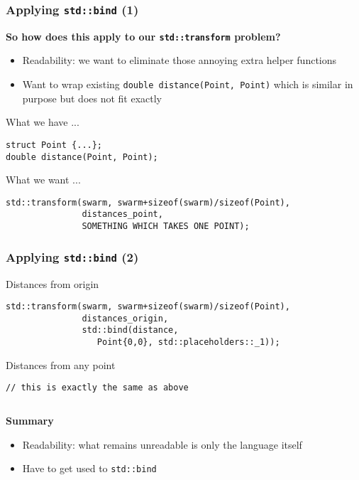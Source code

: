 \begin{frame}[fragile]
  \frametitle{Applying \texttt{std::bind} (1)}

  \textbf{So how does this apply to our \texttt{std::transform}
    problem?}

  \begin{itemize}
  \item Readability: we want to eliminate those annoying extra helper
    functions
  \item Want to wrap existing \texttt{double distance(Point, Point)}
    which is similar in purpose but does not fit exactly
  \end{itemize}

  \begin{block}{What we have ...}
\begin{verbatim}
struct Point {...};
double distance(Point, Point);
\end{verbatim}
  \end{block}

  \begin{block}{What we want ...}
\begin{verbatim}
std::transform(swarm, swarm+sizeof(swarm)/sizeof(Point), 
               distances_point, 
               SOMETHING WHICH TAKES ONE POINT);
\end{verbatim}
  \end{block}
  
\end{frame}

\begin{frame}[fragile]
  \frametitle{Applying \texttt{std::bind} (2)}

  \begin{block}{Distances from origin}
\begin{verbatim}
std::transform(swarm, swarm+sizeof(swarm)/sizeof(Point), 
               distances_origin, 
               std::bind(distance, 
                  Point{0,0}, std::placeholders::_1));
\end{verbatim}
  \end{block}
  
  \begin{block}{Distances from any point}
\begin{verbatim}
// this is exactly the same as above
\end{verbatim}
  \end{block}

  \begin{columns}[t]
  \end{columns}

  \textbf{Summary}

  \begin{itemize}
  \item Readability: what remains unreadable is only the language
    itself
  \item Have to get used to \texttt{std::bind}
  \end{itemize}

\end{frame}

